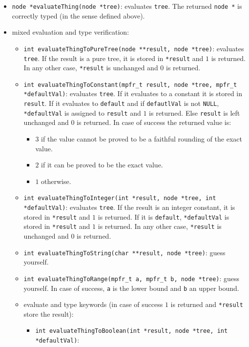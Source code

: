 \documentclass{article}
\begin{document}
\begin{itemize}
  \item \texttt{node *evaluateThing(node *tree)}: evaluates \texttt{tree}. The returned \texttt{node *} is correctly typed (in the sense defined above).
  \item mixed evaluation and type verification:
  \begin{itemize}
  \item \texttt{int evaluateThingToPureTree(node **result, node *tree)}: evaluates \texttt{tree}. If the result is a pure tree, it is stored in \texttt{*result} and $1$ is returned. In any other case, \texttt{*result} is unchanged and $0$ is returned.
  \item \texttt{int evaluateThingToConstant(mpfr\_t result, node *tree, mpfr\_t *defaultVal)}: evaluates \texttt{tree}. If it evaluates to a constant it is stored in \texttt{result}. If it evaluates to \texttt{default} and if \texttt{defautlVal} is not \texttt{NULL}, \texttt{*defaultVal} is assigned to \texttt{result} and $1$ is returned. Else \texttt{result} is left unchanged and $0$ is returned.  In case of success the returned value is:
    \begin{itemize}
    \item $3$ if the value cannot be proved to be a faithful rounding of the exact value.
    \item $2$ if it can be proved to be the exact value.
    \item $1$ otherwise.
    \end{itemize}
  \item \texttt{int evaluateThingToInteger(int *result, node *tree, int *defaultVal)}: evaluates \texttt{tree}. If the result is an integer constant, it is stored in \texttt{*result} and $1$ is returned. If it is \texttt{default}, \texttt{*defaultVal} is stored in \texttt{*result} and $1$ is returned. In any other case, \texttt{*result} is unchanged and $0$ is returned.
  \item \texttt{int evaluateThingToString(char **result, node *tree)}: guess yourself.
  \item \texttt{int evaluateThingToRange(mpfr\_t a, mpfr\_t b, node *tree)}: guess yourself. In case of success, \texttt{a} is the lower bound and \texttt{b} an upper bound.
  \item evaluate and type keywords (in case of success $1$ is returned and \texttt{*result} store the result):
    \begin{itemize}
    \item \texttt{int evaluateThingToBoolean(int *result, node *tree, int *defaultVal)}:

\end{itemize}
\end{itemize}
\end{itemize}
\end{document}
